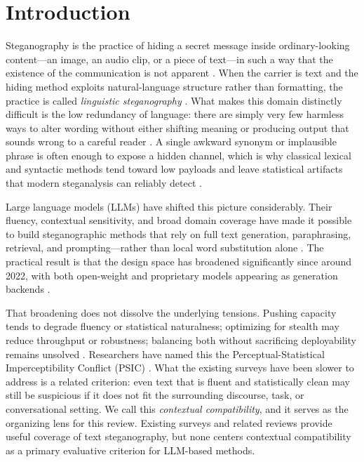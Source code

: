 \section{Introduction}
\label{sec:introduction}

Steganography is the practice of hiding a secret message inside ordinary-looking content---an image, an audio clip, or a piece of text---in such a way that the existence of the communication is not apparent \cite{simmons1984prisoners,fridrich2009steganography}. When the carrier is text and the hiding method exploits natural-language structure rather than formatting, the practice is called \emph{linguistic steganography} \cite{fridrich2009steganography,zhang2020linguistic}. What makes this domain distinctly difficult is the low redundancy of language: there are simply very few harmless ways to alter wording without either shifting meaning or producing output that sounds wrong to a careful reader \cite{yang2020vae,kaptchuk2021meteor}. A single awkward synonym or implausible phrase is often enough to expose a hidden channel, which is why classical lexical and syntactic methods tend toward low payloads and leave statistical artifacts that modern steganalysis can reliably detect \cite{yi2022alisa,li2023rewriting,Wang_2023}.

Large language models (LLMs) have shifted this picture considerably. Their fluency, contextual sensitivity, and broad domain coverage have made it possible to build steganographic methods that rely on full text generation, paraphrasing, retrieval, and prompting---rather than local word substitution alone \cite{xi2025rise,brown2020language,wu2024generative,steinebach2024natural,lin2024zero,bubeck2023sparks}. The practical result is that the design space has broadened significantly since around 2022, with both open-weight and proprietary models appearing as generation backends \cite{xi2025rise,brown2020language}.

That broadening does not dissolve the underlying tensions. Pushing capacity tends to degrade fluency or statistical naturalness; optimizing for stealth may reduce throughput or robustness; balancing both without sacrificing deployability remains unsolved \cite{yang2020vae,kaptchuk2021meteor,ji2024principled,munyer2024deeptextmark}. Researchers have named this the Perceptual-Statistical Imperceptibility Conflict (PSIC) \cite{yang2020vae}. What the existing surveys have been slower to address is a related criterion: even text that is fluent and statistically clean may still be suspicious if it does not fit the surrounding discourse, task, or conversational setting. We call this \emph{contextual compatibility}, and it serves as the organizing lens for this review. Existing surveys and related reviews \cite{math9212829,Setiadi_Ghosal_Sahu_2025,Wang_2023} provide useful coverage of text steganography, but none centers contextual compatibility as a primary evaluative criterion for LLM-based methods.


